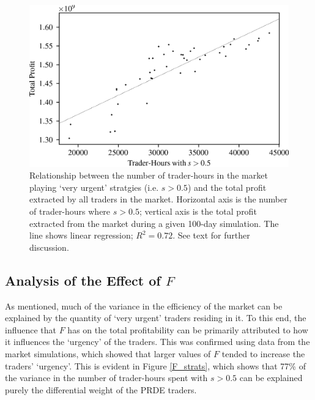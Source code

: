 \documentclass[conference]{IEEEtran}
\begin{document}
\begin{figure}[htbp]
    \centerline{\includegraphics[width=\columnwidth]{strategy_profit.png}}
    \caption{
        Relationship between the number of trader-hours in the market playing `very urgent' stratgies (i.e. $s>0.5$) and the total profit extracted by all traders in the market.
        Horizontal axis is the number of trader-hours where $s>0.5$; vertical axis is the total profit extracted from the market during a given 100-day simulation.
        The line shows linear regression; $R^2=0.72$.
        See text for further discussion.
    }
    \label{strategy_profit}
\end{figure}

\subsection{Analysis of the Effect of $F$}

As mentioned, much of the variance in the efficiency of the market can be explained by the quantity of `very urgent' traders residing in it.
To this end, the influence that $F$ has on the total profitability can be primarily attributed to how it influences the `urgency' of the traders.
This was confirmed using data from the market simulations, which showed that larger values of $F$ tended to increase the traders' `urgency'.
This is evident in Figure \ref{F_strats}, which shows that 77\% of the variance in the number of trader-hours spent with $s>0.5$ can be explained purely the differential weight of the PRDE traders.
\end{document}
